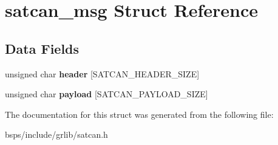 \hypertarget{structsatcan__msg}{}\section{satcan\+\_\+msg Struct Reference}
\label{structsatcan__msg}
\subsection*{Data Fields}
\begin{DoxyCompactItemize}
\item 
\mbox{\label{structsatcan__msg_a574daa882b13f5b890499db8517e8f5b}} 
unsigned char {\bfseries header} \mbox{[}S\+A\+T\+C\+A\+N\+\_\+\+H\+E\+A\+D\+E\+R\+\_\+\+S\+I\+ZE\mbox{]}
\item 
\mbox{\label{structsatcan__msg_aef0016e6eb3ad442b349ffe51f1fe5b6}} 
unsigned char {\bfseries payload} \mbox{[}S\+A\+T\+C\+A\+N\+\_\+\+P\+A\+Y\+L\+O\+A\+D\+\_\+\+S\+I\+ZE\mbox{]}
\end{DoxyCompactItemize}


The documentation for this struct was generated from the following file\+:\begin{DoxyCompactItemize}
\item 
bsps/include/grlib/satcan.\+h\end{DoxyCompactItemize}
